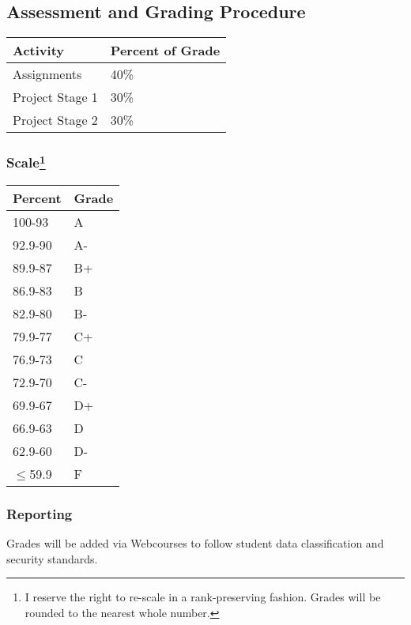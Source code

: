 \documentclass[11pt]{paper}
\begin{document}


\subsection*{Assessment and Grading Procedure}

\begin{flushleft}
\begin{tabular}{ l  l }\hline
 Activity & Percent of Grade \\\hline 
 Assignments &  40\% \\
 Project Stage 1 & 30\% \\
 Project Stage 2 & 30\% \\\hline
\end{tabular}
\end{flushleft}

\subsubsection*{Scale\footnote{I reserve the right to re-scale in a rank-preserving fashion. Grades will be rounded to the nearest whole number.}}
\begin{flushleft}
\begin{tabular}{ l  l }\hline
 Percent & Grade \\\hline 
 100-93 &  A \\
 92.9-90 & A-\\
 89.9-87 & B+ \\
 86.9-83 & B \\
 82.9-80 & B- \\
 79.9-77 & C+ \\
 76.9-73 & C \\
 72.9-70 & C- \\
 69.9-67 & D+ \\
 66.9-63 & D \\
 62.9-60 & D- \\
 $\leq$59.9 & F \\\hline
\end{tabular}
\end{flushleft}

\subsubsection*{Reporting}
Grades will be added via Webcourses to follow student data classification and security standards.
\end{document}
